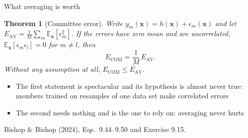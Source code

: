 \documentclass[aspectratio=169, 11pt]{beamer}
\newtheorem{thmx}[theorem]{Theorem}
\newcommand{\srcline}[1]{%
  \par\vspace{0.25em}%
  {\scriptsize\color{mcMuted}\hfill #1\par}}
\newcommand{\src}[3]{}      %
\begin{document}
\begin{frame}{What averaging is worth}
  \src{bishop2024}{equation}{9.44-9.50}
  \src{bishop2024}{equation}{9.64}
  \src{bishop2024}{section}{9.6}
  \vspace{-0.3em}
  \begin{thmx}[Committee error]\label{th:com}
    \small
    Write $y_m(\mathbf{x}) = h(\mathbf{x}) + \epsilon_m(\mathbf{x})$ and let
    $E_{\mathrm{AV}} = \frac{1}{M}\sum_m \mathbb{E}_{\mathbf{x}}[\epsilon_m^2]$.
    If the errors have zero mean and are uncorrelated,
    $\mathbb{E}_{\mathbf{x}}[\epsilon_m \epsilon_l] = 0$ for $m \neq l$, then
    \[
      E_{\mathrm{COM}} = \frac{1}{M}\, E_{\mathrm{AV}} .
    \]
    Without any assumption at all,
    $E_{\mathrm{COM}} \leq E_{\mathrm{AV}}$.
  \end{thmx}
  \vspace{0.2em}
  \begin{itemize}\itemsep0.24em
    \item The first statement is spectacular and its hypothesis is
          almost never true: members trained on resamples of one data
          set make \alert{correlated} errors
    \item The second needs nothing and is the one to rely on: averaging
          never hurts
  \end{itemize}
  \srcline{Bishop \& Bishop (2024), Eqs.~9.44--9.50 and Exercise 9.15.}
\end{frame}
\end{document}
